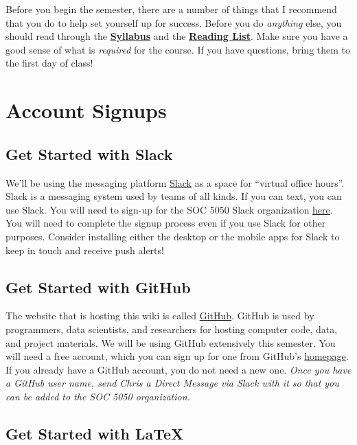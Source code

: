 \documentclass[]{book}
\theoremstyle{definition}
\theoremstyle{definition}
\theoremstyle{definition}
\theoremstyle{remark}
\begin{document}
Before you begin the semester, there are a number of things that I
recommend that you do to help set yourself up for success. Before you do
\emph{anything} else, you should read through the
\href{https://cdn.rawgit.com/slu-soc5050/Core-Documents/bdcce556/syllabus.pdf}{\textbf{Syllabus}}
and the
\href{https://cdn.rawgit.com/slu-soc5050/Core-Documents/bdcce556/reading-list.pdf}{\textbf{Reading
List}}. Make sure you have a good sense of what is \emph{required} for
the course. If you have questions, bring them to the first day of class!

\section{Account Signups}\label{account-signups}

\subsection{Get Started with Slack}\label{get-started-with-slack}

We'll be using the messaging platform \href{https://slack.com}{Slack} as
a space for ``virtual office hours''. Slack is a messaging system used
by teams of all kinds. If you can text, you can use Slack. You will need
to sign-up for the SOC 5050 Slack organization
\href{https://join.slack.com/t/slu-soc5050/signup}{here}. You will need
to complete the signup process even if you use Slack for other purposes.
Consider installing either the desktop or the mobile apps for Slack to
keep in touch and receive push alerts!

\subsection{Get Started with GitHub}\label{get-started-with-github}

The website that is hosting this wiki is called
\href{https://github.com/}{GitHub}. GitHub is used by programmers, data
scientists, and researchers for hosting computer code, data, and project
materials. We will be using GitHub extensively this semester. You will
need a free account, which you can sign up for one from GitHub's
\href{https://github.com/}{homepage}. If you already have a GitHub
account, you do not need a new one. \emph{Once you have a GitHub user
name, send Chris a Direct Message via Slack with it so that you can be
added to the SOC 5050 organization.}

\subsection{Get Started with LaTeX}\label{get-started-with-latex}
\end{document}
